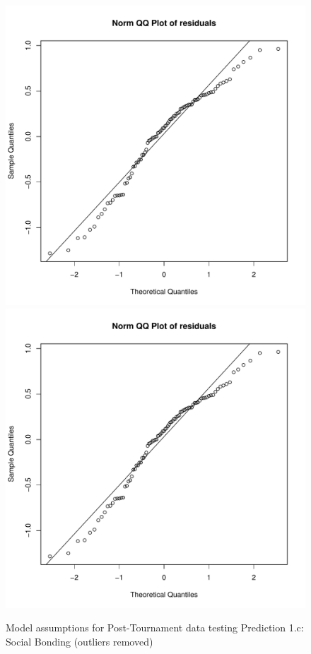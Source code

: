 \begin{CJK}{UTF8}{gbsn}
\begin{figure}[htbp]
              \includegraphics[scale =.4]{images/MLM3aOutQQNorm.pdf}
              \includegraphics[scale =.4]{images/MLM3aOutCooksD.pdf}
              \caption{Model assumptions for Post-Tournament data testing Prediction 1.c: Social Bonding (outliers removed)}
             \label{fig:MLM3aOutAssumptions}
            \end{figure}



\end{CJK}
